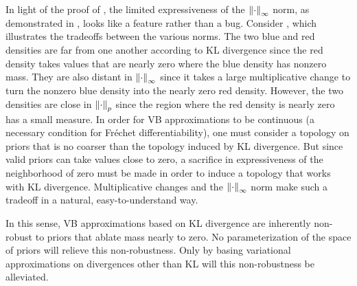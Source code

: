 In light of the proof of , the limited
expressiveness of the $\left\Vert\cdot\right\Vert_{\infty}$ norm, as demonstrated in
, looks like a feature rather than a bug.
Consider , which illustrates the tradeoffs between
the various norms.  The two blue and red densities are far from one another according
to KL divergence since the red density takes values that are
nearly zero where the blue density has nonzero mass. They are also distant in
$\left\Vert\cdot\right\Vert_{\infty}$ since it takes a large multiplicative change
to turn the nonzero blue density into the nearly zero red density. However, the
two densities are close in $\left\Vert\cdot\right\Vert_{p}$ since the region where the red
density is nearly zero has a small measure. In order for VB approximations to be
continuous (a necessary condition for Fr{\'e}chet differentiability), one must
consider a topology on priors that is no coarser than the topology induced by KL
divergence.  But since valid priors can take values close to zero, a sacrifice
in expressiveness of the neighborhood of zero must be made in order to induce a
topology that works with KL divergence. Multiplicative changes and the
$\left\Vert\cdot\right\Vert_{\infty}$ norm make such a tradeoff in a natural, easy-to-understand
way.

\FunctionDistFig{}

In this sense, VB approximations based on KL divergence are inherently
non-robust to priors that ablate mass nearly to zero.  No parameterization of
the space of priors will relieve this non-robustness.  Only by basing
variational approximations on divergences other than KL will this non-robustness
be alleviated.




